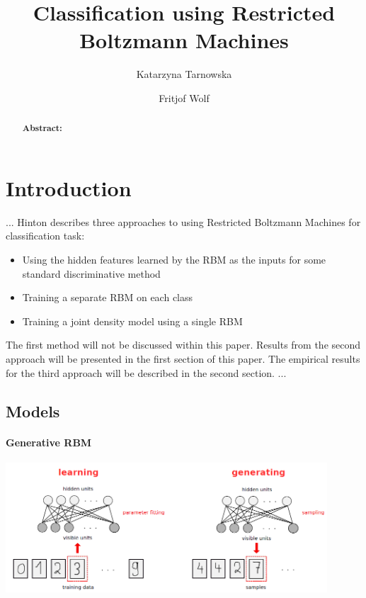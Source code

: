 \documentclass[a4paper]{scrartcl}
\begin{document}
\title{Classification using Restricted Boltzmann Machines}
\author{Katarzyna Tarnowska \and Fritjof Wolf}
\maketitle
\newpage
\begin{abstract}
\textbf{Abstract:} 
\end{abstract}

\section{Introduction}
...
Hinton \cite{Hinton} describes three approaches to using Restricted Boltzmann Machines for classification task:
\begin{itemize}
    \item Using the hidden features learned by the RBM as the inputs for some standard discriminative method
    \item Training a separate RBM on each class
	\item Training a joint density model using a single RBM
\end{itemize}
The first method will not be discussed within this paper. Results from the second approach will be presented in the first section of this paper. The empirical results for the third approach will be described in the second section.
...
\subsection{Models}
\paragraph{Generative RBM}
\begin{center}
\includegraphics[width=12cm]{images/generativeRBM.png}
\end{center}
\end{document}
